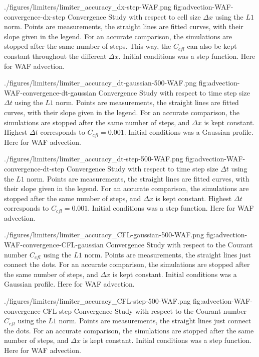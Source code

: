 \quickfigcap
	{./figures/limiters/limiter_accuracy_dx-step-WAF.png}
	{fig:advection-WAF-convergence-dx-step}
	{
		Convergence Study with respect to cell size $\Delta x$ using the $L1$ norm.
		Points are measurements, the straight lines are fitted curves, with their slope given in the legend.
		For an accurate comparison, the simulations are stopped after the same number of steps.
		This way, the $C_{cfl}$ can also be kept constant throughout the different $\Delta x$.
		Initial conditions was a step function.
		Here for WAF advection.
	}
	



\quickfigcap
	{./figures/limiters/limiter_accuracy_dt-gaussian-500-WAF.png}
	{fig:advection-WAF-convergence-dt-gaussian}
	{
		Convergence Study with respect to time step size $\Delta t$ using the $L1$ norm.
		Points are measurements, the straight lines are fitted curves, with their slope given in the legend.
		For an accurate comparison, the simulations are stopped after the same number of steps, and $\Delta x$ is kept constant.
		Highest $\Delta t$ corresponds to $C_{cfl} = 0.001$.
		Initial conditions was a Gaussian profile.
		Here for WAF advection.
	}


\quickfigcap
	{./figures/limiters/limiter_accuracy_dt-step-500-WAF.png}
	{fig:advection-WAF-convergence-dt-step}
	{
		Convergence Study with respect to time step size $\Delta t$ using the $L1$ norm.
		Points are measurements, the straight lines are fitted curves, with their slope given in the legend.
		For an accurate comparison, the simulations are stopped after the same number of steps, and $\Delta x$ is kept constant.
		Highest $\Delta t$ corresponds to $C_{cfl} = 0.001$.
		Initial conditions was a step function.
		Here for WAF advection.
	}
	



\quickfigcap
	{./figures/limiters/limiter_accuracy_CFL-gaussian-500-WAF.png}
	{fig:advection-WAF-convergence-CFL-gaussian}
	{
		Convergence Study with respect to the Courant number $C_{cfl}$ using the $L1$ norm.
		Points are measurements, the straight lines just connect the dots.
		For an accurate comparison, the simulations are stopped after the same number of steps, and $\Delta x$ is kept constant.
		Initial conditions was a Gaussian profile.
		Here for WAF advection.
	}


\quickfigcap
	{./figures/limiters/limiter_accuracy_CFL-step-500-WAF.png}
	{fig:advection-WAF-convergence-CFL-step}
	{
		Convergence Study with respect to the Courant number $C_{cfl}$ using the $L1$ norm.
		Points are measurements, the straight lines just connect the dots.
		For an accurate comparison, the simulations are stopped after the same number of steps, and $\Delta x$ is kept constant.
		Initial conditions was a step function.
		Here for WAF advection.
	}
	
















